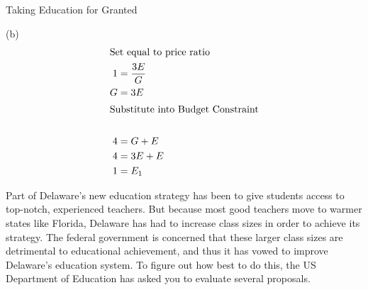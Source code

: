 \documentclass[8pt]{extarticle}
\begin{document}
\begin{problem}{Taking Education for Granted}
\begin{problem}{(b)}
\begin{align*}
                   \shortintertext{Set equal to price ratio}
        1 &= \frac{3E}{G}\\
        G &= 3E\\
        \shortintertext{Substitute into Budget Constraint}\\
        4 &= G + E \\
        4 &= 3E + E\\
        1 &= E_1
      \end{align*}
    \end{problem}
    Part of Delaware's new education strategy has been to give students access to top-notch, experienced teachers. But because most good teachers move to warmer states like Florida, Delaware has had to increase class sizes in order to achieve its strategy. The federal government is concerned that these larger class sizes are detrimental to educational achievement, and thus it has vowed to improve Delaware's education system. To figure out how best to do this, the US Department of Education has asked you to evaluate several proposals.


\end{problem}
\end{document}
